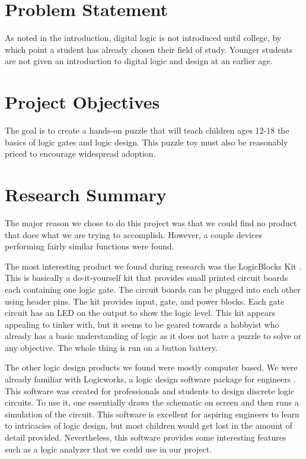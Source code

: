 \documentclass[12pt]{report}
\begin{document}
\section*{Problem Statement}

As noted in the introduction, digital logic is not introduced until college, by which point a student has already chosen their field of study.  Younger students are not given an introduction to digital logic and design at an earlier age. 

\section*{Project Objectives}

The goal is to create a hands-on puzzle that will teach children ages 12-18 the basics of logic gates and logic design.  This puzzle toy must also be reasonably priced to encourage widespread adoption.  

\section*{Research Summary}

The major reason we chose to do this project was that we could find no product that does what we are trying to accomplish. However, a couple devices performing fairly similar functions were found.

The most interesting product we found during research was the LogicBlocks Kit \cite{1}. This is basically a do-it-yourself kit that provides small printed circuit boards each containing one logic gate. The circuit boards can be plugged into each other using header pins. The kit provides input, gate, and power blocks. Each gate circuit has an LED on the output to show the logic level. This kit appears appealing to tinker with, but it seems to be geared towards a hobbyist who already has a basic understanding of logic as it does not have a puzzle to solve or any objective. The whole thing is run on a button battery.

The other logic design products we found were mostly computer based. We were already familiar with Logicworks, a logic design software package for engineers \cite{2}. This software was created for professionals and students to design discrete logic circuits. To use it, one essentially draws the schematic on screen and then runs a simulation of the circuit. This software is excellent for aspiring engineers to learn to intricacies of logic design, but most children would get lost in the amount of detail provided. Nevertheless, this software provides some interesting features such as a logic analyzer that we could use in our project.
\end{document}
